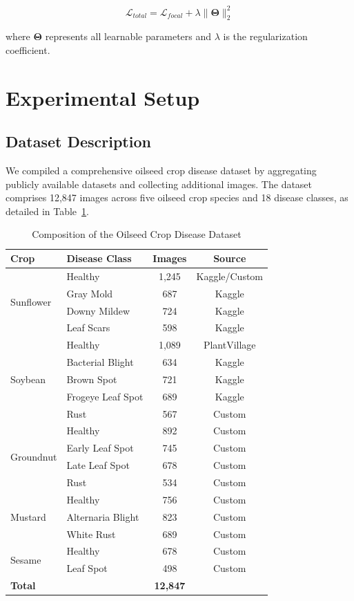 \documentclass[default, iicol]{sn-jnl}
\theoremstyle{thmstyleone}%
\theoremstyle{thmstyletwo}%
\theoremstyle{thmstylethree}%
\begin{document}
\begin{equation}
\mathcal{L}_{total} = \mathcal{L}_{focal} + \lambda \|\mathbf{\Theta}\|_2^2
\label{eq:total_loss}
\end{equation}

where $\mathbf{\Theta}$ represents all learnable parameters and $\lambda$ is the regularization coefficient.

\section{Experimental Setup}\label{sec:experiments}

\subsection{Dataset Description}

We compiled a comprehensive oilseed crop disease dataset by aggregating publicly available datasets and collecting additional images. The dataset comprises 12,847 images across five oilseed crop species and 18 disease classes, as detailed in Table~\ref{tab:dataset}.

\begin{table}[htbp]
\centering
\caption{Composition of the Oilseed Crop Disease Dataset}
\label{tab:dataset}
\begin{tabular}{@{}llcc@{}}
\toprule
\textbf{Crop} & \textbf{Disease Class} & \textbf{Images} & \textbf{Source} \\
\midrule
\multirow{4}{*}{Sunflower} & Healthy & 1,245 & Kaggle/Custom \\
& Gray Mold & 687 & Kaggle \\
& Downy Mildew & 724 & Kaggle \\
& Leaf Scars & 598 & Kaggle \\
\midrule
\multirow{5}{*}{Soybean} & Healthy & 1,089 & PlantVillage \\
& Bacterial Blight & 634 & Kaggle \\
& Brown Spot & 721 & Kaggle \\
& Frogeye Leaf Spot & 689 & Kaggle \\
& Rust & 567 & Custom \\
\midrule
\multirow{4}{*}{Groundnut} & Healthy & 892 & Custom \\
& Early Leaf Spot & 745 & Custom \\
& Late Leaf Spot & 678 & Custom \\
& Rust & 534 & Custom \\
\midrule
\multirow{3}{*}{Mustard} & Healthy & 756 & Custom \\
& Alternaria Blight & 823 & Custom \\
& White Rust & 689 & Custom \\
\midrule
\multirow{2}{*}{Sesame} & Healthy & 678 & Custom \\
& Leaf Spot & 498 & Custom \\
\midrule
\multicolumn{2}{l}{\textbf{Total}} & \textbf{12,847} & \\
\bottomrule
\end{tabular}
\end{table}
\end{document}
